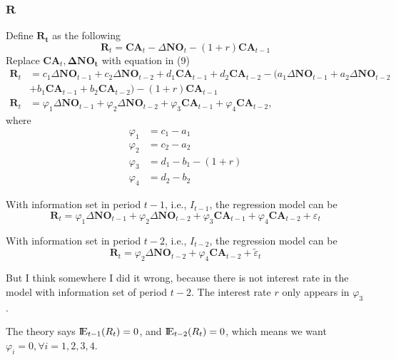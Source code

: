 \documentclass[12pt]{article}
\begin{document}
\subsubsection{$ \bm{R} $}
Define $ \bm{R_{t}} $ as the following
\begin{equation*}
\bm{R}_{t} = \bm{CA}_{t} - \Delta \bm{NO}_{t} - (1 + r) \bm{CA}_{t - 1}
\end{equation*}
Replace $ \bm{CA}_{t}, \bm{ \Delta NO_{t}} $ with equation in (9)
\begin{align*}
\bm{R}_{t} &= c_1 \Delta \bm{NO}_{t - 1} + c_2 \Delta \bm{NO}_{t - 2} + d_1 
\bm{CA}_{t - 1}  + d_2 \bm{CA}_{t - 2} - (a_1 \Delta \bm{NO}_{t - 1} + a_2 \Delta 
\bm{NO}_{t - 2} \\
&+ b_1 \bm{CA}_{t - 1} + b_2 \bm{CA}_{t - 2}) - (1 + r) \bm{CA}_{t - 1}\\
\bm{R}_{t}&= \varphi_1 \Delta \bm{NO}_{t - 1} + \varphi_2 \Delta \bm{NO}_{t - 2} +
\varphi_3 \bm{CA}_{t - 1} + \varphi_4 \bm{CA}_{t - 2},
\end{align*}
where 
\begin{align*}
\varphi_1  &= c_1 - a_1\\
\varphi_2 &= c_2 - a_2\\
\varphi_3 &= d_1 - b_1 - (1 + r)\\
\varphi_4 &= d_2 - b_2
\end{align*}


With information set in period $ t - 1 $, i.e., $ I_{t - 1} $, the regression model
can be 
\begin{equation*}
\bm{R}_{t}= \varphi_1 \Delta \bm{NO}_{t - 1} + \varphi_2 \Delta \bm{NO}_{t - 2} +
\varphi_3 \bm{CA}_{t - 1} + \varphi_4 \bm{CA}_{t - 2} + \varepsilon_{t}
\end{equation*}

With information set in period $ t - 2 $, i.e., $ I_{t - 2} $, the regression model
can be 
\begin{equation*}
		\bm{R}_{t} = \varphi_2 \Delta \bm{NO}_{t - 2} + \varphi_4 \bm{CA}_{t - 2} + 
		 \widetilde{\varepsilon}_{t}
\end{equation*}

But I think somewhere I did it wrong, because there is not interest rate in the model
with information set of period $ t - 2 $. The interest rate $ r $ only appears in 
$ \varphi_3 $.


The theory says $ {\rm I\!{E}}_{t - 1}(R_{t}) = 0 $, and $ {\rm I\!{E}}_{t - 2}(R_{t})
= 0$, which means we want $ \varphi_{i} = 0, \forall i = 1,2,3,4$.
\end{document}
